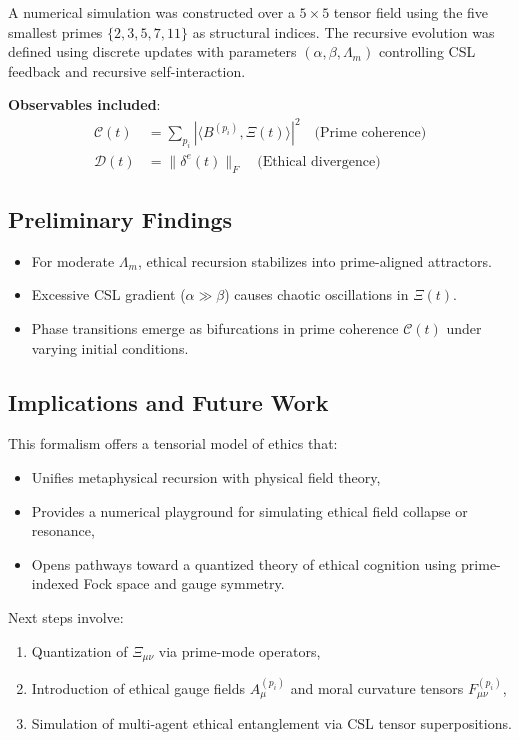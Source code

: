 \documentclass{article}
\theoremstyle{plain}
\begin{document}
A numerical simulation was constructed over a $5 \times 5$ tensor field using the five smallest primes $\{2, 3, 5, 7, 11\}$ as structural indices. The recursive evolution was defined using discrete updates with parameters $(\alpha, \beta, \Lambda_m)$ controlling CSL feedback and recursive self-interaction.

\textbf{Observables included}:
\begin{align*}
\mathcal{C}(t) &= \sum_{p_i} \left| \langle B^{(p_i)}, \Xi(t) \rangle \right|^2 \quad \text{(Prime coherence)} \\
\mathcal{D}(t) &= \| \delta^e(t) \|_F \quad \text{(Ethical divergence)}
\end{align*}

\subsection{Preliminary Findings}

\begin{itemize}
  \item For moderate $\Lambda_m$, ethical recursion stabilizes into prime-aligned attractors.
  \item Excessive CSL gradient ($\alpha \gg \beta$) causes chaotic oscillations in $\Xi(t)$.
  \item Phase transitions emerge as bifurcations in prime coherence $\mathcal{C}(t)$ under varying initial conditions.
\end{itemize}

\subsection{Implications and Future Work}

This formalism offers a tensorial model of ethics that:
\begin{itemize}
  \item Unifies metaphysical recursion with physical field theory,
  \item Provides a numerical playground for simulating ethical field collapse or resonance,
  \item Opens pathways toward a quantized theory of ethical cognition using prime-indexed Fock space and gauge symmetry.
\end{itemize}

Next steps involve:
\begin{enumerate}
  \item Quantization of $\Xi_{\mu\nu}$ via prime-mode operators,
  \item Introduction of ethical gauge fields $A^{(p_i)}_\mu$ and moral curvature tensors $F^{(p_i)}_{\mu\nu}$,
  \item Simulation of multi-agent ethical entanglement via CSL tensor superpositions.
\end{enumerate}
\end{document}
